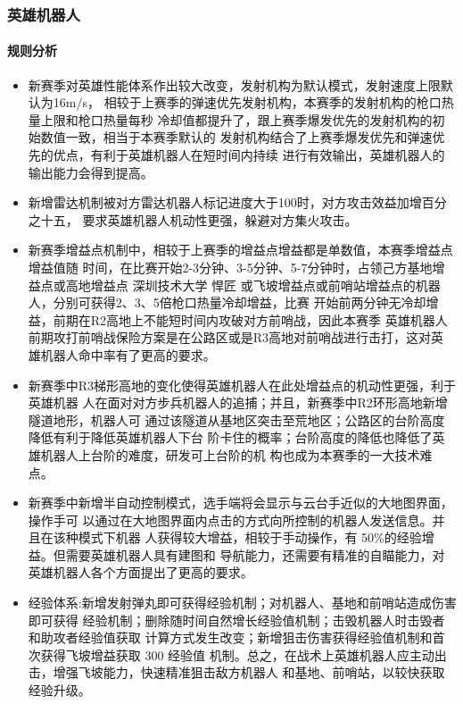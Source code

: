 \subsubsection{英雄机器人}

    \paragraph{规则分析}


        \begin{itemize}
            \item 新赛季对英雄性能体系作出较大改变，发射机构为默认模式，发射速度上限默认为16m/s， 相较于上赛季的弹速优先发射机构，本赛季的发射机构的枪口热量上限和枪口热量每秒 冷却值都提升了，跟上赛季爆发优先的发射机构的初始数值一致，相当于本赛季默认的 发射机构结合了上赛季爆发优先和弹速优先的优点，有利于英雄机器人在短时间内持续 进行有效输出，英雄机器人的输出能力会得到提高。
            \item 新增雷达机制被对方雷达机器人标记进度大于100时，对方攻击效益加增百分之十五， 要求英雄机器人机动性更强，躲避对方集火攻击。
            \item 新赛季增益点机制中，相较于上赛季的增益点增益都是单数值，本赛季增益点增益值随 时间，在比赛开始2-3分钟、3-5分钟、5-7分钟时，占领己方基地增益点或高地增益点 深圳技术大学 悍匠  或飞坡增益点或前哨站增益点的机器人，分别可获得2、3、5倍枪口热量冷却增益，比赛 开始前两分钟无冷却增益，前期在R2高地上不能短时间内攻破对方前哨战，因此本赛季 英雄机器人前期攻打前哨战保险方案是在公路区或是R3高地对前哨战进行击打，这对英 雄机器人命中率有了更高的要求。
            \item 新赛季中R3梯形高地的变化使得英雄机器人在此处增益点的机动性更强，利于英雄机器 人在面对对方步兵机器人的追捕；并且，新赛季中R2环形高地新增隧道地形，机器人可 通过该隧道从基地区突击至荒地区；公路区的台阶高度降低有利于降低英雄机器人下台 阶卡住的概率；台阶高度的降低也降低了英雄机器人上台阶的难度，研发可上台阶的机 构也成为本赛季的一大技术难点。
            \item 新赛季中新增半自动控制模式，选手端将会显示与云台手近似的大地图界面，操作手可 以通过在大地图界面内点击的方式向所控制的机器人发送信息。并且在该种模式下机器 人获得较大增益，相较于手动操作，有 50\%的经验增益。但需要英雄机器人具有建图和 导航能力，还需要有精准的自瞄能力，对英雄机器人各个方面提出了更高的要求。
            \item 经验体系:新增发射弹丸即可获得经验机制；对机器人、基地和前哨站造成伤害即可获得 经验机制；删除随时间自然增长经验值机制；击毁机器人时击毁者和助攻者经验值获取 计算方式发生改变；新增狙击伤害获得经验值机制和首次获得飞坡增益获取 300 经验值 机制。总之，在战术上英雄机器人应主动出击，增强飞坡能力，快速精准狙击敌方机器人 和基地、前哨站，以较快获取经验升级。
        \end{itemize}
    
